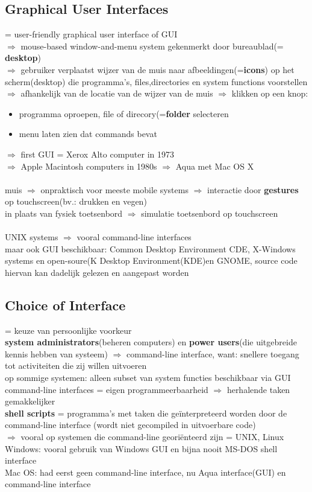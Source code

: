 \documentclass{report}
\begin{document}
\subsection{Graphical User Interfaces}
= user-friendly graphical user interface of GUI
\\$\Rightarrow$ mouse-based window-and-menu system gekenmerkt door bureaublad(= \textbf{desktop})
\\$\Rightarrow$ gebruiker verplaatst wijzer van de muis naar afbeeldingen(=\textbf{icons}) op het scherm(desktop) die programma's, files,directories en system functions voorstellen
\\$\Rightarrow$ afhankelijk van de locatie van de wijzer van de muis $\Rightarrow$ klikken op een knop:
\begin{itemize}
\item programma oproepen, file of direcory(=\textbf{folder} selecteren
\item menu laten zien dat commands bevat
\end{itemize}
$\Rightarrow$ first GUI = Xerox Alto computer in 1973
\\$\Rightarrow$ Apple Macintosh computers in 1980s $\Rightarrow$ Aqua met Mac OS X
\\
\\ muis $\Rightarrow$ onpraktisch voor meeste mobile systems $\Rightarrow$ interactie door \textbf{gestures} op touchscreen(bv.: drukken en vegen)
\\ in plaats van fysiek toetsenbord $\Rightarrow$ simulatie toetsenbord op touchscreen
\\
\\UNIX systems $\Rightarrow$ vooral command-line interfaces
\\maar ook GUI beschikbaar: Common Desktop Environment CDE, X-Windows systems en open-soure(K Desktop Environment(KDE)en GNOME, source code hiervan kan dadelijk gelezen en aangepast worden 

\subsection{Choice of Interface}
= keuze van persoonlijke voorkeur 
\\ \textbf{system administrators}(beheren computers) en \textbf{power users}(die uitgebreide kennis hebben van systeem) $\Rightarrow$ command-line interface, want: snellere toegang tot activiteiten die zij willen uitvoeren
\\op sommige systemen: alleen subset van system functies beschikbaar via GUI
\\command-line interfaces = eigen programmeerbaarheid $\Rightarrow$ herhalende taken gemakkelijker
\\ \textbf{shell scripts} = programma's met taken die ge\"interpreteerd worden door de command-line interface (wordt niet gecompiled in uitvoerbare code)
\\ $\Rightarrow$ vooral op systemen die command-line georiënteerd zijn = UNIX, Linux 
\\ Windows: vooral gebruik van Windows GUI en bijna nooit MS-DOS shell interface
\\ Mac OS: had eerst geen command-line interface, nu Aqua interface(GUI) en command-line interface
\end{document}
